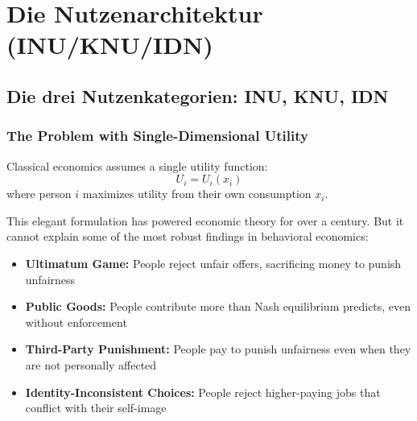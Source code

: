 \section{Die Nutzenarchitektur (INU/KNU/IDN)}
\label{sec:fepsde-utility}


\subsection{Die drei Nutzenkategorien: INU, KNU, IDN}
\label{subsec:three-categories}


\subsubsection{The Problem with Single-Dimensional Utility}

Classical economics assumes a single utility function:
\begin{equation}
U_i = U_i(x_i)
\end{equation}
where person $i$ maximizes utility from their own consumption $x_i$.

This elegant formulation has powered economic theory for over a century.
But it cannot explain some of the most robust findings in behavioral economics:

\begin{itemize}
\item \textbf{Ultimatum Game:} People reject unfair offers, sacrificing money 
to punish unfairness \citep{PAP-guth1982experimental}
\item \textbf{Public Goods:} People contribute more than Nash equilibrium predicts, 
even without enforcement \citep{PAP-fehr2000cooperation}
\item \textbf{Third-Party Punishment:} People pay to punish unfairness 
even when they are not personally affected \citep{fehr2004third}
\item \textbf{Identity-Inconsistent Choices:} People reject higher-paying jobs 
that conflict with their self-image \citep{akerlofkranton}
\end{itemize}

